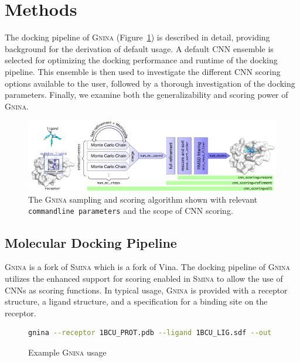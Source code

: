 \documentclass[linenumbers,doublespacing]{bmcart}
\begin{document}
\section{Methods}

The docking pipeline of \textsc{Gnina} (Figure~\ref{fig:workflow}) is described in detail, providing background for the derivation of default usage. A default CNN ensemble is selected for optimizing the docking performance and runtime of the docking pipeline. This ensemble is then used to investigate the different CNN scoring options available to the user, followed by a thorough investigation of the docking parameters. Finally, we examine both the generalizability and scoring power of \textsc{Gnina}.

\begin{figure}[tbh]
    \centering
    \includegraphics[width=\linewidth]{figures/gnina}
    \caption{The \textsc{Gnina} sampling and scoring algorithm shown with relevant \texttt{commandline parameters} and the scope of CNN scoring.}
    \label{fig:workflow}
\end{figure}

\subsection{Molecular Docking Pipeline}
\textsc{\textsc{Gnina}} is a fork of \textsc{Smina}\cite{koes2013lessons} which is a fork of Vina\cite{trott2010autodock}. The docking pipeline of \textsc{\textsc{Gnina}} utilizes the enhanced support for scoring enabled in \textsc{Smina} to allow the use of CNNs as scoring functions. In typical usage, \textsc{\textsc{Gnina}} is provided with a receptor structure, a ligand structure, and a specification for a binding site on the receptor.

\begin{figure}[tbh]
    \begin{lstlisting}[label=code:Usage,language=bash,basicstyle=\tt]
gnina --receptor 1BCU_PROT.pdb --ligand 1BCU_LIG.sdf --out 1BCU_gnina_poses.sdf.gz --autobox_ligand 1BCU_LIG.sdf --autobox_add 4 --cnn crossdock_default2018 dense_3 --cnn_scoring rescore --exhaustiveness 8 --num_mc_saved 50 --cnn_rotation 0 --num_modes 9 --min_rmsd_filter 1
    \end{lstlisting}
\caption{Example \textsc{Gnina} usage}
\end{figure}
\end{document}
